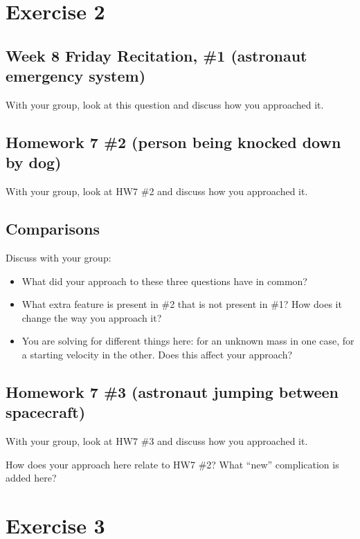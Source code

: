 \documentclass[12pt]{article}
\begin{document}
\newpage
\section{Exercise 2}

\subsection{Week 8 Friday Recitation, \#1 (astronaut emergency system)}

With your group, look at this question and discuss how you approached it.

\subsection{Homework 7 \#2 (person being knocked down by dog)}

With your group, look at HW7 \#2 and discuss how you approached it. 

\subsection{Comparisons}

Discuss with your group:

\begin{itemize}
	\item What did your approach to these three questions have in common?
	\item What extra feature is present in \#2 that is not present in \#1? How does it change the way you approach it?
	\item You are solving for different things here: for an unknown mass in one case, for a starting velocity in the other. Does this affect your approach?
\end{itemize}


\subsection{Homework 7 \#3 (astronaut jumping between spacecraft)}

With your group, look at HW7 \#3 and discuss how you approached it. 

How does your approach here relate to HW7 \#2? What ``new'' complication is added here?

\newpage

\section{Exercise 3}
\end{document}
